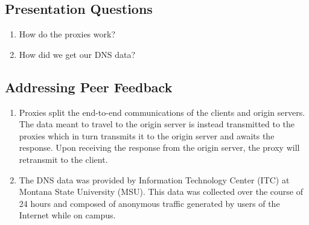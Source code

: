 \documentclass{llcns}
\begin{document}
\subsection{Presentation Questions}

\begin{enumerate}
    \item How do the proxies work?
    \item How did we get our DNS data?
\end{enumerate}

\subsection{Addressing Peer Feedback}

\begin{enumerate}
    \item Proxies split the end-to-end communications of the clients and origin servers. The data meant to travel to the origin server is instead transmitted to the proxies which in turn transmits it to the origin server and awaits the response. Upon receiving the response from the origin server, the proxy will retransmit to the client.
    \item The DNS data was provided by Information Technology Center (ITC) at Montana State University (MSU). This data was collected over the course of 24 hours and composed of anonymous traffic generated by users of the Internet while on campus. 
\end{enumerate}
\end{document}
